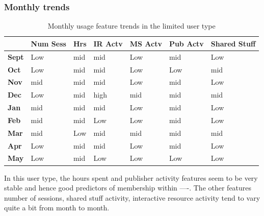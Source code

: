 \documentclass{acm_proc_article-sp}
\begin{document}
\subsubsection{Monthly trends}
\begin{table}
\caption{Monthly usage feature trends in the limited user type}
\begin{tabular}{|p{1.5cm}|p{0.6cm}|p{0.6cm}|p{0.6cm}|p{0.6cm}|p{0.8cm}|p{0.8cm}|}
 & Num Sess & Hrs & IR Actv & MS Actv & Pub Actv & Shared Stuff \\ \hline
\textbf{Sept} & Low                                    & mid   & mid         & Low             & mid            & Low                 \\  \hline
\textbf{Oct}   & Low                                    & mid   & mid         & Low             & Low            & mid                 \\  \hline
\textbf{Nov}  & mid                                    & mid   & mid         & Low             & mid            & Low                 \\  \hline
\textbf{Dec}  & Low                                    & mid   & high        & mid             & mid            & mid                 \\  \hline
\textbf{Jan}   & mid                                    & mid   & mid         & Low             & mid            & Low                 \\ \hline
\textbf{Feb}  & mid                                    & mid   & Low         & Low             & mid            & Low                 \\  \hline
\textbf{Mar}     & mid                                    & Low   & mid         & mid             & mid            & mid                 \\ \hline
\textbf{Apr}     & Low                                    & mid   & mid         & Low             & mid            & Low                 \\ \hline
\textbf{May}       & Low                                    & mid   & Low         & Low             & Low            &   Low                 
\end{tabular}
\end{table}
In this user type, the hours spent and publisher activity features seem to be very stable and hence good predictors of membership within ----. The other features number of sessions, shared stuff activity, interactive resource activity tend to vary quite a bit from month to month.
\end{document}
